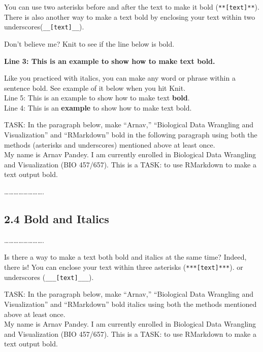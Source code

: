 \documentclass[
]{article}
\begin{document}
\hfill\break

You can use two asterisks before and after the text to make it bold
(\texttt{**{[}text{]}**}).\\
There is also another way to make a text bold by enclosing your text
within two underscores(\texttt{\_\_{[}text{]}\_\_}).

Don't believe me? Knit to see if the line below is bold.

\textbf{Line 3: This is an example to show how to make text bold.}

\hfill\break

Like you practiced with italics, you can make any word or phrase within
a sentence bold. See example of it below when you hit Knit.\\
Line 5: This is an example to show how to make text \textbf{bold}.\\
Line 4: This is an \textbf{example} to show how to make text bold.

\hfill\break

TASK: In the paragraph below, make ``Arnav,'' ``Biological Data
Wrangling and Visualization'' and ``RMarkdown'' bold in the following
paragraph using both the methods (asterisks and underscores) mentioned
above at least once.\\
My name is Arnav Pandey. I am currently enrolled in Biological Data
Wrangling and Visualization (BIO 457/657). This is a TASK: to use
RMarkdown to make a text output bold.

\hfill\break

\ldots\ldots\ldots\ldots\ldots\ldots\ldots\ldots.

\subsection{2.4 Bold and Italics}\label{bold-and-italics}

\ldots\ldots\ldots\ldots\ldots\ldots\ldots\ldots.

Is there a way to make a text both bold and italics at the same time?
Indeed, there is! You can enclose your text within three asterisks
(\texttt{***{[}text{]}***}). or underscores
(\texttt{\_\_\_{[}text{]}\_\_\_}).

\hfill\break

TASK: In the paragraph below, make ``Arnav,'' ``Biological Data
Wrangling and Visualization'' and ``RMarkdown'' bold italics using both
the methods mentioned above at least once.\\
My name is Arnav Pandey. I am currently enrolled in Biological Data
Wrangling and Visualization (BIO 457/657). This is a TASK: to use
RMarkdown to make a text output bold.
\end{document}
